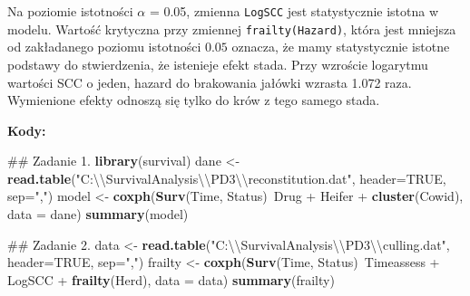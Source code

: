 \documentclass[]{article}
\newenvironment{Shaded}{}{}
\newcommand{\KeywordTok}[1]{\textcolor[rgb]{0.00,0.44,0.13}{\textbf{{#1}}}}
\newcommand{\DataTypeTok}[1]{\textcolor[rgb]{0.56,0.13,0.00}{{#1}}}
\newcommand{\CharTok}[1]{\textcolor[rgb]{0.25,0.44,0.63}{{#1}}}
\newcommand{\StringTok}[1]{\textcolor[rgb]{0.25,0.44,0.63}{{#1}}}
\newcommand{\OtherTok}[1]{\textcolor[rgb]{0.00,0.44,0.13}{{#1}}}
\newcommand{\NormalTok}[1]{{#1}}
\begin{document}
Na poziomie istotności \(\alpha\) = 0.05, zmienna \texttt{LogSCC} jest
statystycznie istotna w modelu. Wartość krytyczna przy zmiennej
\texttt{frailty(Hazard)}, która jest mniejsza od zakładanego poziomu
istotności \(0.05\) oznacza, że mamy statystycznie istotne podstawy do
stwierdzenia, że istenieje efekt stada. Przy wzroście logarytmu wartości
SCC o jeden, hazard do brakowania jałówki wzrasta 1.072 raza. Wymienione
efekty odnoszą się tylko do krów z tego samego stada.

\newpage
\textbf{Kody:}

\begin{Shaded}
\begin{Highlighting}[]
\NormalTok{## Zadanie 1.}
\KeywordTok{library}\NormalTok{(survival)}
\NormalTok{dane <-}\StringTok{ }\KeywordTok{read.table}\NormalTok{(}\StringTok{"C:}\CharTok{\textbackslash{}\textbackslash{}}\StringTok{SurvivalAnalysis}\CharTok{\textbackslash{}\textbackslash{}}\StringTok{PD3}\CharTok{\textbackslash{}\textbackslash{}}\StringTok{reconstitution.dat"}\NormalTok{, }\DataTypeTok{header=}\OtherTok{TRUE}\NormalTok{, }\DataTypeTok{sep=}\StringTok{","}\NormalTok{)}
\NormalTok{model <-}\StringTok{ }\KeywordTok{coxph}\NormalTok{(}\KeywordTok{Surv}\NormalTok{(Time, Status)~Drug +}\StringTok{ }\NormalTok{Heifer +}\StringTok{ }\KeywordTok{cluster}\NormalTok{(Cowid), }\DataTypeTok{data =} \NormalTok{dane) }
\KeywordTok{summary}\NormalTok{(model)}

\NormalTok{## Zadanie 2.}
\NormalTok{data <-}\StringTok{ }\KeywordTok{read.table}\NormalTok{(}\StringTok{"C:}\CharTok{\textbackslash{}\textbackslash{}}\StringTok{SurvivalAnalysis}\CharTok{\textbackslash{}\textbackslash{}}\StringTok{PD3}\CharTok{\textbackslash{}\textbackslash{}}\StringTok{culling.dat"}\NormalTok{, }\DataTypeTok{header=}\OtherTok{TRUE}\NormalTok{, }\DataTypeTok{sep=}\StringTok{","}\NormalTok{)}
\NormalTok{frailty <-}\StringTok{ }\KeywordTok{coxph}\NormalTok{(}\KeywordTok{Surv}\NormalTok{(Time, Status)~Timeassess +}\StringTok{ }\NormalTok{LogSCC +}\StringTok{ }\KeywordTok{frailty}\NormalTok{(Herd), }\DataTypeTok{data =} \NormalTok{data)}
\KeywordTok{summary}\NormalTok{(frailty)}
\end{Highlighting}
\end{Shaded}
\end{document}
